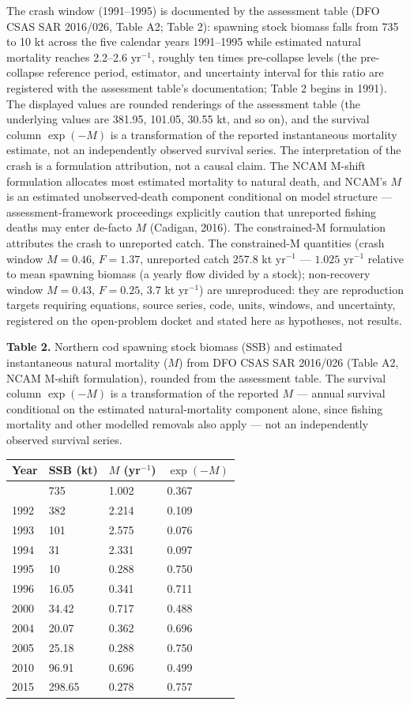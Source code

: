 \documentclass[11pt]{article}
\begin{document}
The crash window (1991--1995) is documented by the assessment table (DFO
CSAS SAR 2016/026, Table A2; Table 2): spawning stock biomass falls from
735 to 10 kt across the five calendar years 1991--1995 while estimated
natural mortality reaches 2.2--2.6 yr\(^{-1}\), roughly ten times
pre-collapse levels (the pre-collapse reference period, estimator, and
uncertainty interval for this ratio are registered with the assessment
table's documentation; Table 2 begins in 1991). The displayed values are
rounded renderings of the assessment table (the underlying values are
381.95, 101.05, 30.55 kt, and so on), and the survival column
\(\exp(-M)\) is a transformation of the reported instantaneous mortality
estimate, not an independently observed survival series. The
interpretation of the crash is a formulation attribution, not a causal
claim. The NCAM M-shift formulation allocates most estimated mortality
to natural death, and NCAM's \(M\) is an estimated unobserved-death
component conditional on model structure --- assessment-framework
proceedings explicitly caution that unreported fishing deaths may enter
de-facto \(M\) (Cadigan, 2016). The constrained-M formulation attributes
the crash to unreported catch. The constrained-M quantities (crash
window \(M=0.46\), \(F=1.37\), unreported catch \(257.8\) kt yr\(^{-1}\)
--- \(1.025\) yr\(^{-1}\) relative to mean spawning biomass (a yearly
flow divided by a stock); non-recovery window \(M=0.43\), \(F=0.25\),
\(3.7\) kt yr\(^{-1}\)) are unreproduced: they are reproduction targets
requiring equations, source series, code, units, windows, and
uncertainty, registered on the open-problem docket and stated here as
hypotheses, not results.

\textbf{Table 2.} Northern cod spawning stock biomass (SSB) and
estimated instantaneous natural mortality (\(M\)) from DFO CSAS SAR
2016/026 (Table A2, NCAM M-shift formulation), rounded from the
assessment table. The survival column \(\exp(-M)\) is a transformation
of the reported \(M\) --- annual survival conditional on the estimated
natural-mortality component alone, since fishing mortality and other
modelled removals also apply --- not an independently observed survival
series.

\begin{longtable}[]{@{}llll@{}}
\toprule\noalign{}
Year & SSB (kt) & \(M\) (yr\(^{-1}\)) & \(\exp(-M)\) \\
\midrule\noalign{}
\endhead
\bottomrule\noalign{}
\endlastfoot
1991 & 735 & 1.002 & 0.367 \\
1992 & 382 & 2.214 & 0.109 \\
1993 & 101 & 2.575 & 0.076 \\
1994 & 31 & 2.331 & 0.097 \\
1995 & 10 & 0.288 & 0.750 \\
1996 & 16.05 & 0.341 & 0.711 \\
2000 & 34.42 & 0.717 & 0.488 \\
2004 & 20.07 & 0.362 & 0.696 \\
2005 & 25.18 & 0.288 & 0.750 \\
2010 & 96.91 & 0.696 & 0.499 \\
2015 & 298.65 & 0.278 & 0.757 \\
\end{longtable}
\end{document}
